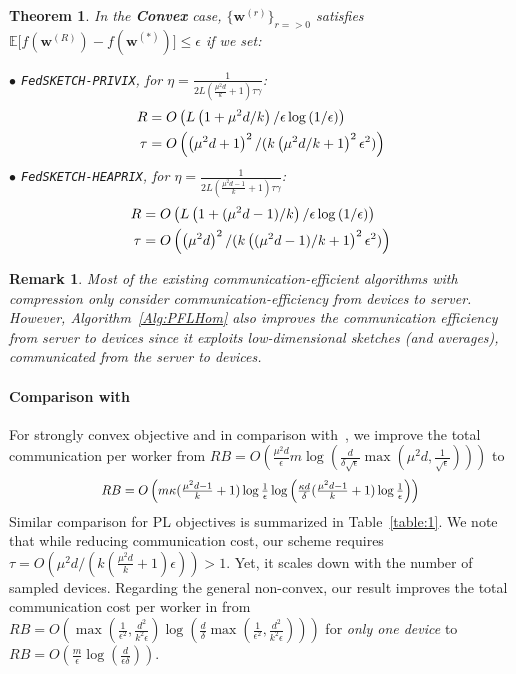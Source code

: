\documentclass[twoside]{article}
\newtheorem{theorem}{Theorem}
\newtheorem{remark}{Remark}
\newcommand*{\Resize}[2]{\resizebox{#1}{!}{$#2$}}%
\begin{document}
\begin{theorem}
In the \textbf{Convex} case, $\{ {\boldsymbol{w}}^{(r)}\}_{r=>0}$ satisfies $ \mathbb{E}\Big[f({\boldsymbol{w}}^{(R)})-f({\boldsymbol{w}}^{(*)})\Big]\leq \epsilon$ if we set:  

\noindent $\bullet$ \texttt{FedSKETCH-PRIVIX}, for $\eta=\frac{1}{2L\left(\frac{\mu^2d}{k}+1\right)\tau\gamma}$:  
\begin{equation}\notag
\begin{split}
R& =O\left(L\left(1+\mu^2d/k\right)/\epsilon\log\left(1/\epsilon \right)\right)\\
\tau&=O\left(\left(\mu^2d+1\right)^2/(k\left(\mu^2d/k+1\right)^2\epsilon^2)\right)
 \end{split}
\end{equation}
\noindent $\bullet$ \texttt{FedSKETCH-HEAPRIX}, for $\eta=\frac{1}{2L\left(\frac{\mu^2d-1}{k}+1\right)\tau\gamma}$: 
\begin{equation}\notag
\begin{split}
R& =O\left(L\left(1+(\mu^2d-1)/k\right)/\epsilon\log\left(1/\epsilon \right)\right)\\
 \tau&=O\left(\left(\mu^2d\right)^2/(k\left((\mu^2d-1)/k+1\right)^2\epsilon^2)\right)
 \end{split}
\end{equation}
\end{theorem}


\begin{remark}
Most of the existing communication-efficient algorithms with compression only consider communication-efficiency from devices to server. 
However, Algorithm~\ref{Alg:PFLHom} also improves the communication efficiency from server to devices since it exploits low-dimensional sketches (and averages), communicated from the server to devices. 
\end{remark}

\paragraph{Comparison with \cite{ivkin2019communication}}
For strongly convex objective and in comparison with~\cite{ivkin2019communication}, we improve the total communication per worker from 
$RB=O\left(\frac{\mu^2 d}{\epsilon}m\log\left(\frac{d}{\delta\sqrt{\epsilon}}\max\left({\mu^2 d},\frac{1}{\sqrt{\epsilon}}\right)\right)\right)$ to 
\[ \Resize{8cm}{RB=O\left({m}\kappa(\frac{\mu^2d-1}{k}+1)\log\frac{1}{\epsilon}\log\left(\frac{\kappa d}{\delta}(\frac{\mu^2d-1}{k}+1)\log\frac{1}{\epsilon}\right)\right)}\]
Similar comparison for PL objectives is summarized in Table~\ref{table:1}. 
We note that while reducing communication cost, our scheme requires $\tau=O(\mu^2 d/(k(\frac{\mu^2 d}{k}+1)\epsilon))>1$. 
Yet, it scales down with the number of sampled devices. 
Regarding the general non-convex, our result improves the total communication cost per worker in \cite{ivkin2019communication} from $RB=O\left(\max\left(\frac{1}{\epsilon^2},\frac{d^2}{k^2\epsilon}\right)\log\left(\frac{d}{\delta}\max\left(\frac{1}{\epsilon^2},\frac{d^2}{k^2\epsilon}\right)\right)\right)$ for \emph{only one device} to $RB=O\left(\frac{m}{\epsilon}\log\left(\frac{d}{\epsilon\delta}\right)\right)$.
\end{document}
